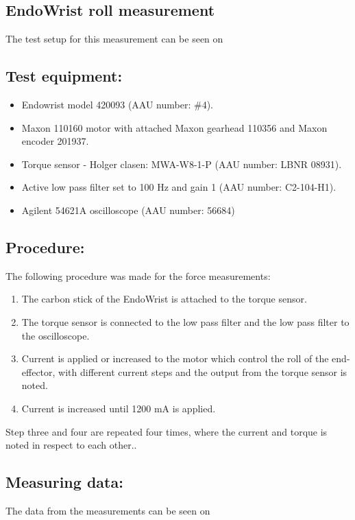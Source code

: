 \subsection{EndoWrist roll measurement}%
The test setup for this measurement can be seen on 

\subsection*{Test equipment:}
\begin{itemize}
\item Endowrist model 420093 (AAU number: \#4).
\item Maxon 110160 motor with attached Maxon gearhead 110356 and Maxon encoder 201937.
\item Torque sensor - Holger clasen: MWA-W8-1-P (AAU number: LBNR 08931).
\item Active low pass filter set to 100 Hz and gain 1 (AAU number: C2-104-H1).
\item Agilent 54621A oscilloscope (AAU number: 56684)
\end{itemize}

\subsection*{Procedure:}
The following procedure was made for the force measurements:
\begin{enumerate}
\item The carbon stick of the EndoWrist is attached to the torque sensor. 
\item The torque sensor is connected to the low pass filter and the low pass filter to the oscilloscope.
\item Current is applied or increased to the motor which control the roll of the end-effector, with different current steps and the output from the torque sensor is noted.
\item Current is increased until 1200 mA is applied.
\end{enumerate}
Step three and four are repeated four times, where the current and torque is noted in respect to each other.. 

\subsection*{Measuring data:}
The data from the measurements can be seen on 

